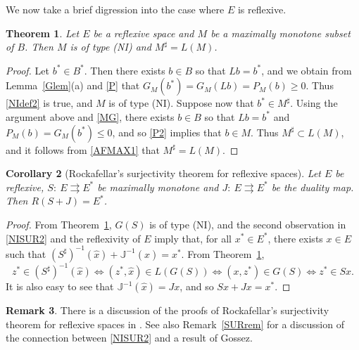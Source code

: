 \documentclass[letterpaper]{article}
\theoremstyle{plain}
\newtheorem{theorem}{Theorem}[section]
\newtheorem{corollary}[theorem]{Corollary}
\theoremstyle{definition}
\newtheorem{remark}[theorem]{Remark}
\numberwithin{equation}{section}
\newcommand{\J}{{\mathbb J}}
\newcommand{\toto}{\rightrightarrows}
\newcommand{\wh}{\widehat}
\newcommand{\Cor}{Corollary~\ref}
\newcommand{\Lem}{Lemma~\ref}
\newcommand{\Rem}{Remark~\ref}
\newcommand{\Sec}{Section~\ref}
\newcommand{\Thm}{Theorem~\ref}
\begin{document}
%
We now take a brief digression into the case where $E$ is reflexive.
\begin{theorem}\label{NIrefl}
Let $E$ be a reflexive space and $M$ be a maximally monotone subset of $B$.   Then $M$ is of type (NI) and  $M^\sharp = L(M)$. 
\end{theorem}
%
\begin{proof}Let $b^* \in B^*$. Then there exists $b \in B$ so that $Lb = b^*$, and we obtain from \Lem{Glem}(a) and \eqref{P} that $G_M(b^*) = G_M(Lb) = P_M(b) \ge 0$.   Thus \eqref{NIdef2} is true, and $M$ is of type (NI).   Suppose now that $b^* \in M^\sharp$.   Using the argument above and \eqref{MG}, there exists $b \in B$ so that $Lb = b^*$ and $P_M(b) = G_M(b^*) \le 0$, and so \eqref{P2} implies that $b \in M$.   Thus $M^\sharp \subset L(M)$, and it follows from \eqref{AFMAX1} that $M^\sharp = L(M)$.     
\end{proof}
\begin{corollary}[Rockafellar's surjectivity theorem for reflexive spaces]\label{ROCKSURcor}
Let $E$ be reflexive, $S\colon\ E \toto E^*$ be maximally monotone and $J\colon\ E \toto E^*$ be the duality map.   Then $R(S + J) = E^*$.
\end{corollary}
\begin{proof}
From \Thm{NIrefl}, $G(S)$ is of type (NI), and the second observation in \eqref{NISUR2} and the reflexivity of $E$ imply that, for all $x^* \in E^*$, there exists $x \in E$ such that $(S^\sharp)^{-1}(\wh x) + {\J}^{-1}(\wh x) = x^*$.   From \Thm{NIrefl},
%
$$z^* \in (S^\sharp)^{-1}(\wh x) \iff (z^*,\wh x) \in L(G(S)) \iff (x,z^*) \in G(S) \iff z^* \in Sx.$$
%
It is also easy to see that ${\J}^{-1}(\wh x) = Jx$, and so $Sx + Jx = x^*$. 
\end{proof}
%
\begin{remark}
There is a discussion of the proofs of Rockafellar's surjectivity theorem for reflexive spaces in \cite[Remark 29.4, p.\ 118]{HBM}.   See also \Rem{SURrem} for a discussion of the connection between \eqref{NISUR2} and a result of Gossez.  
\end{remark}
\end{document}
